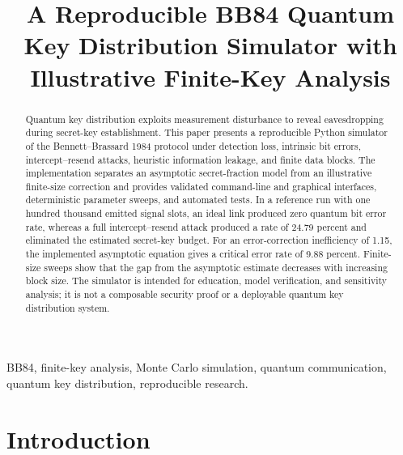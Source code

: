\documentclass[conference]{IEEEtran}
\begin{document}
\title{A Reproducible BB84 Quantum Key Distribution Simulator with
Illustrative Finite-Key Analysis}

\author{
}

\maketitle

\begin{abstract}
Quantum key distribution exploits measurement disturbance to reveal
eavesdropping during secret-key establishment. This paper presents a
reproducible Python simulator of the Bennett--Brassard 1984 protocol under
detection loss, intrinsic bit errors, intercept--resend attacks, heuristic
information leakage, and finite data blocks. The implementation separates an
asymptotic secret-fraction model from an illustrative finite-size correction
and provides validated command-line and graphical interfaces, deterministic
parameter sweeps, and automated tests. In a reference run with one hundred
thousand emitted signal slots, an ideal link produced zero quantum bit error
rate, whereas a full intercept--resend attack produced a rate of 24.79 percent
and eliminated the estimated secret-key budget. For an error-correction
inefficiency of 1.15, the implemented asymptotic equation gives a critical
error rate of 9.88 percent. Finite-size sweeps show that the gap from the
asymptotic estimate decreases with increasing block size. The simulator is
intended for education, model verification, and sensitivity analysis; it is
not a composable security proof or a deployable quantum key distribution
system.
\end{abstract}

\begin{IEEEkeywords}
BB84, finite-key analysis, Monte Carlo simulation, quantum communication,
quantum key distribution, reproducible research.
\end{IEEEkeywords}

\section{Introduction}
\end{document}
